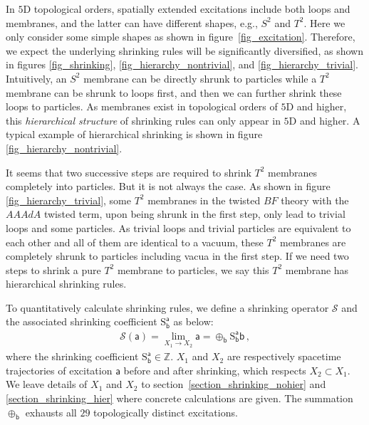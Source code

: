 \documentclass[11pt,nofootinbib,preprint]{revtex4-1}
\def\Z{\mathbb{Z}}
\begin{document}
In $5$D topological orders, spatially extended excitations include both loops and membranes, and the latter can have different shapes, e.g., $S^2$ and $T^2$. Here we only consider some simple shapes as shown in figure~\ref{fig_excitation}. Therefore, we expect the underlying shrinking rules will be significantly diversified, as shown in figures \ref{fig_shrinking}, \ref{fig_hierarchy_nontrivial},  and \ref{fig_hierarchy_trivial}. Intuitively,  an $S^2$ membrane can be directly shrunk to particles while a $T^2$ membrane can be shrunk to loops first, and then we can further shrink these loops to particles. As membranes exist in topological orders of $5$D and higher, this \textit{hierarchical structure} of shrinking rules can only appear in $5$D and higher. A typical example of hierarchical shrinking is shown in figure \ref{fig_hierarchy_nontrivial}. 

It seems that   two successive steps are required to shrink $T^2$ membranes completely into particles. But it is not always the case. As shown in figure \ref{fig_hierarchy_trivial}, some $T^2$ membranes in the twisted $BF$ theory with the $AAAdA$ twisted term, upon being shrunk in the first step, only lead to trivial loops and some particles. As trivial loops and trivial particles are equivalent to each other and all of them are identical to a vacuum, these $T^2$ membranes are completely shrunk to particles including vacua in the first step. If we need two steps to shrink a pure $T^2$ membrane to particles, we say this $T^2$ membrane has hierarchical shrinking rules. 
 
 
 
To quantitatively calculate shrinking rules, we  define a shrinking operator $\mathcal{S}$ and the associated shrinking coefficient ${\mathrm{S}}_{\mathsf{b}}^{\mathsf{a}}$ as below:
\begin{align}
\mathcal{S}\left(\mathsf{a}\right)=\underset{X_{1}\rightarrow X_{2}}{\lim}\mathsf{a}=\oplus_{\mathsf{b}} {\mathrm{S}}_{\mathsf{b}}^{\mathsf{a}} \mathsf{b}\,,\label{eq_shrinking_coefficient}
\end{align}
where the shrinking coefficient ${\mathrm{S}}_{\mathsf{b}}^{\mathsf{a}}\in\Z$. $X_1$ and $X_2$ are respectively  spacetime trajectories of excitation $\mathsf{a}$ before and after shrinking, which respects $X_2\subset X_1$. We leave details of $X_1$ and $X_2$ to section~\ref{section_shrinking_nohier} and \ref{section_shrinking_hier} where concrete calculations are given.  The summation   $\oplus_{\mathsf{b}}$ exhausts all $29$ topologically distinct excitations. 
 
\end{document}
